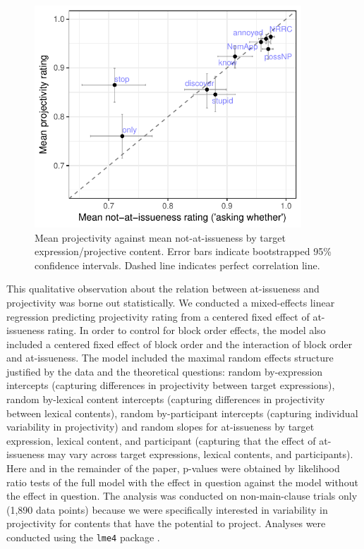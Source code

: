 \documentclass[11pt,fleqn]{article}
\newcommand{\6}{\mbox{$[\hspace*{-.6mm}[$}}
\newcommand{\9}{\mbox{$]\hspace*{-.6mm}]$}}
\begin{document}
\begin{figure}[!h]

\begin{center}
\includegraphics[width=10cm]{../results/exp1a/graphs/ai-proj-bytrigger-labels}
\end{center}

\caption{Mean projectivity against mean not-at-issueness by target expression/projective content. Error bars indicate bootstrapped 95\% confidence intervals. Dashed line indicates perfect correlation line.}
\label{fig:f-proj-ai-1a}
\end{figure}

This qualitative observation about the relation between at-issueness and projectivity was borne out statistically. We conducted a mixed-effects linear regression predicting projectivity rating from a centered fixed effect of at-issueness rating. In order to control for block order effects, the model also included a centered fixed effect of block order and the interaction of block order and at-issueness. The model included the maximal random effects structure justified by the data and the theoretical questions: random by-expression intercepts (capturing differences in projectivity between target expressions),  random by-lexical content intercepts (capturing differences in projectivity between lexical contents), random by-participant intercepts (capturing individual variability in projectivity) and random slopes for at-issueness by target expression, lexical content, and participant (capturing that the effect of at-issueness may vary across target expressions, lexical contents, and participants). Here and in the remainder of the paper, p-values were obtained by likelihood ratio tests of the full model with the effect in question against the model without the effect in question. The analysis was conducted on non-main-clause trials only (1,890 data points) because we were specifically interested in variability in projectivity for contents that have the potential to project. Analyses were conducted using the \verb|lme4| package \citep{bates2015}.
\end{document}
